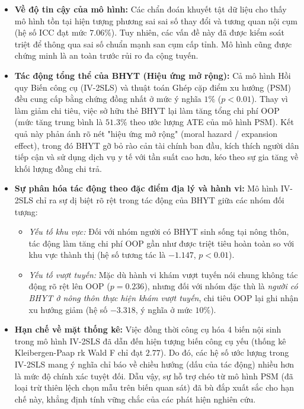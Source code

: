 \documentclass[12pt,a4paper]{article}
\begin{document}
\begin{itemize}
	\item \textbf{Về độ tin cậy của mô hình:} Các chẩn đoán khuyết tật dữ liệu cho thấy mô hình tồn tại hiện tượng phương sai sai số thay đổi và tương quan nội cụm (hệ số ICC đạt mức $7.06\%$). Tuy nhiên, các vấn đề này đã được kiểm soát triệt để thông qua sai số chuẩn mạnh san cụm cấp tỉnh. Mô hình cũng được chứng minh là an toàn trước rủi ro đa cộng tuyến.
	
	\item \textbf{Tác động tổng thể của BHYT (Hiệu ứng mở rộng):} Cả mô hình Hồi quy Biến công cụ (IV-2SLS) và thuật toán Ghép cặp điểm xu hướng (PSM) đều cung cấp bằng chứng đồng nhất ở mức ý nghĩa $1\%$ ($p < 0.01$). Thay vì làm giảm chi tiêu, việc sở hữu thẻ BHYT lại làm tăng tổng chi phí OOP (mức tăng trung bình là $51.3\%$ theo ước lượng ATE của mô hình PSM). Kết quả này phản ánh rõ nét "hiệu ứng mở rộng" (moral hazard / expansion effect), trong đó BHYT gỡ bỏ rào cản tài chính ban đầu, kích thích người dân tiếp cận và sử dụng dịch vụ y tế với tần suất cao hơn, kéo theo sự gia tăng về khối lượng đồng chi trả.
	
	\item \textbf{Sự phân hóa tác động theo đặc điểm địa lý và hành vi:} Mô hình IV-2SLS chỉ ra sự dị biệt rõ rệt trong tác động của BHYT giữa các nhóm đối tượng:
	\begin{itemize}
		\item \textit{Yếu tố khu vực:} Đối với nhóm người có BHYT sinh sống tại nông thôn, tác động làm tăng chi phí OOP gần như được triệt tiêu hoàn toàn so với khu vực thành thị (hệ số tương tác là $-1.147$, $p < 0.01$).
		\item \textit{Yếu tố vượt tuyến:} Mặc dù hành vi khám vượt tuyến nói chung không tác động rõ rệt lên OOP ($p = 0.236$), nhưng đối với nhóm đặc thù là \textit{người có BHYT ở nông thôn thực hiện khám vượt tuyến}, chi tiêu OOP lại ghi nhận xu hướng giảm (hệ số $-3.318$, ý nghĩa ở mức $10\%$).
	\end{itemize}
	
	\item \textbf{Hạn chế về mặt thống kê:} Việc đồng thời công cụ hóa 4 biến nội sinh trong mô hình IV-2SLS đã dẫn đến hiện tượng biến công cụ yếu (thống kê Kleibergen-Paap rk Wald F chỉ đạt $2.77$). Do đó, các hệ số ước lượng trong IV-2SLS mang ý nghĩa chỉ báo về chiều hướng (dấu của tác động) nhiều hơn là mức độ chính xác tuyệt đối. Dẫu vậy, sự hỗ trợ chéo từ mô hình PSM (đã loại trừ thiên lệch chọn mẫu trên biến quan sát) đã bù đắp xuất sắc cho hạn chế này, khẳng định tính vững chắc của các phát hiện nghiên cứu.
\end{itemize}
\end{document}
